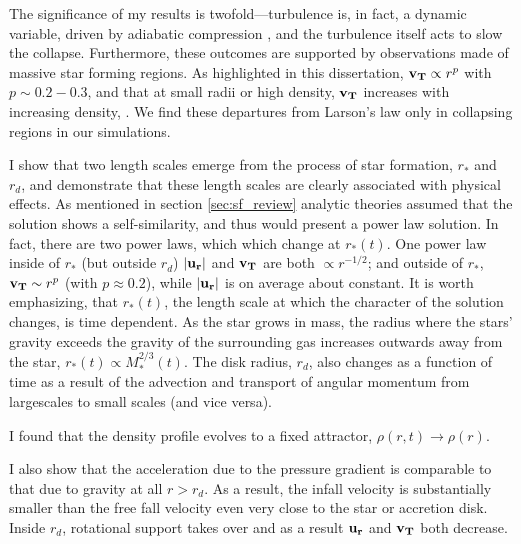 \documentclass[../dissertation.tex]{subfiles}
\begin{document}
The significance of my results is twofold---turbulence is, in fact, a dynamic variable, driven by adiabatic compression \citep{2012ApJ...750L..31R}, 
and the turbulence itself acts to slow the collapse. 
Furthermore, these outcomes are supported by observations made of massive star forming regions. 
As highlighted in this dissertation,  $\mathbf{v_T} \propto r^p$ with $ p \sim 0.2-0.3$, and that at small radii or high density, $\mathbf{v_T}$  
increases with increasing density, \citep{1997ApJ...476..730P}. 
We find these departures from Larson's law only in collapsing regions in our simulations. 

I show that two length scales emerge from the process of star formation, $r_*$ and $r_d$, and demonstrate that these length scales are clearly associated with physical effects. 
As mentioned in section \ref{sec:sf_review} analytic theories assumed that the solution shows a self-similarity, and thus would present a power law solution.
In fact, there are two power laws, which which change at $r_*(t)$. 
One power law inside of $r_*$ (but outside $r_d$) $|\mathbf{u_r}|$ and  $\mathbf{v_T}$ are both
$\propto r^{-1/2}$; and outside of $r_*$, $\mathbf{v_T} \sim r^{p}$ (with $p\approx0.2$), while $|\mathbf{u_r}|$ is on average about constant. 
It is worth emphasizing, that $r_*(t)$, the length scale at which the character of the solution changes, is time dependent. 
As the star grows in mass, the radius where the stars' gravity exceeds the gravity of the surrounding gas increases outwards away from the star, 
$r_*(t) \propto M_*^{2/3}(t)$.
The disk radius, $r_d$, also changes as a function of time as a result of the advection and 
transport of angular momentum from largescales to small scales (and vice versa).

I found that the density profile evolves to a fixed attractor, $\rho(r,t ) \rightarrow \rho(r)$. 

I also show that the acceleration due to the pressure gradient is comparable to that due to gravity at all $r>r_d$. 
As a result, the infall velocity is substantially smaller than the free fall velocity
even very close to the star or accretion disk. 
Inside $r_d$, rotational support takes over and as a result $\mathbf{u_r}$ and $\mathbf{v_T}$ both decrease.  
\end{document}
